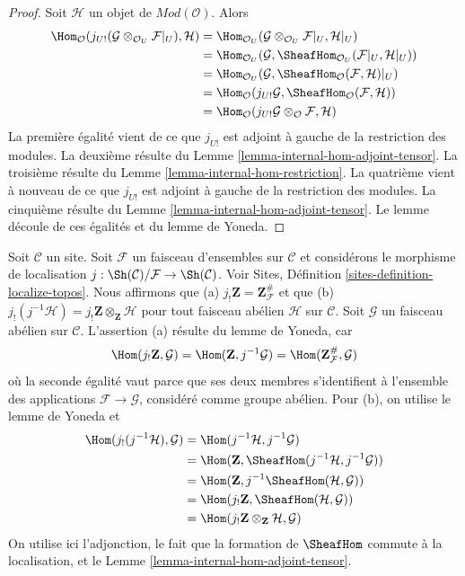 \begin{proof}
Soit $\mathcal{H}$ un objet de $\textit{Mod}(\mathcal{O})$. Alors
\begin{align*}
\Hom_\mathcal{O}(j_{U!}(\mathcal{G} \otimes_{\mathcal{O}_U} \mathcal{F}|_U),
\mathcal{H})
& =
\Hom_{\mathcal{O}_U}(\mathcal{G} \otimes_{\mathcal{O}_U} \mathcal{F}|_U,
\mathcal{H}|_U) \\
& =
\Hom_{\mathcal{O}_U}(\mathcal{G},
\SheafHom_{\mathcal{O}_U}(\mathcal{F}|_U, \mathcal{H}|_U)) \\
& =
\Hom_{\mathcal{O}_U}(\mathcal{G},
\SheafHom_\mathcal{O}(\mathcal{F}, \mathcal{H})|_U) \\
& =
\Hom_\mathcal{O}(j_{U!}\mathcal{G},
\SheafHom_\mathcal{O}(\mathcal{F}, \mathcal{H})) \\
& =
\Hom_\mathcal{O}(j_{U!}\mathcal{G} \otimes_\mathcal{O} \mathcal{F},
\mathcal{H})
\end{align*}
La première égalité vient de ce que $j_{U!}$ est adjoint à gauche de la
restriction des modules. La deuxième résulte du
Lemme \ref{lemma-internal-hom-adjoint-tensor}.
La troisième résulte du Lemme \ref{lemma-internal-hom-restriction}.
La quatrième vient à nouveau de ce que $j_{U!}$ est adjoint à gauche de la
restriction des modules. La cinquième résulte du
Lemme \ref{lemma-internal-hom-adjoint-tensor}.
Le lemme découle de ces égalités et du lemme de Yoneda.
\end{proof}

\begin{remark}
\label{remark-j-shriek-tensor}
Soit $\mathcal{C}$ un site. Soit $\mathcal{F}$ un faisceau d'ensembles sur
$\mathcal{C}$ et considérons le morphisme de localisation
$j : \Sh(\mathcal{C})/\mathcal{F} \to \Sh(\mathcal{C})$.
Voir Sites, Définition \ref{sites-definition-localize-topos}.
Nous affirmons que (a) $j_!\mathbf{Z} = \mathbf{Z}_\mathcal{F}^\#$ et que
(b) $j_!(j^{-1}\mathcal{H}) = j_!\mathbf{Z} \otimes_\mathbf{Z} \mathcal{H}$
pour tout faisceau abélien $\mathcal{H}$ sur $\mathcal{C}$.
Soit $\mathcal{G}$ un faisceau abélien sur $\mathcal{C}$.
L'assertion (a) résulte du lemme de Yoneda, car
$$
\Hom(j_!\mathbf{Z}, \mathcal{G}) =
\Hom(\mathbf{Z}, j^{-1}\mathcal{G}) =
\Hom(\mathbf{Z}_\mathcal{F}^\#, \mathcal{G})
$$
où la seconde égalité vaut parce que ses deux membres s'identifient à
l'ensemble des applications $\mathcal{F} \to \mathcal{G}$, considéré comme
groupe abélien. Pour (b), on utilise le lemme de Yoneda et
\begin{align*}
\Hom(j_!(j^{-1}\mathcal{H}), \mathcal{G})
& =
\Hom(j^{-1}\mathcal{H}, j^{-1}\mathcal{G}) \\
& =
\Hom(\mathbf{Z}, \SheafHom(j^{-1}\mathcal{H}, j^{-1}\mathcal{G})) \\
& =
\Hom(\mathbf{Z}, j^{-1}\SheafHom(\mathcal{H}, \mathcal{G})) \\
& =
\Hom(j_!\mathbf{Z}, \SheafHom(\mathcal{H}, \mathcal{G})) \\
& =
\Hom(j_!\mathbf{Z} \otimes_\mathbf{Z} \mathcal{H}, \mathcal{G})
\end{align*}
On utilise ici l'adjonction, le fait que la formation de $\SheafHom$ commute à
la localisation, et le Lemme \ref{lemma-internal-hom-adjoint-tensor}.
\end{remark}

